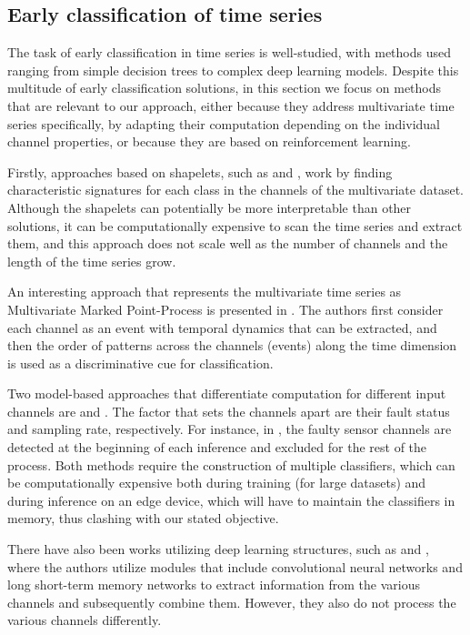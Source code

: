 \documentclass[conference]{IEEEtran}
\begin{document}
\subsection{Early classification of time series}
The task of early classification in time series is well-studied, with methods used ranging from simple decision trees to complex deep learning models\cite{gupta2020ects}. Despite this multitude of early classification solutions, in this section we focus on methods that are relevant to our approach, either because they address multivariate time series specifically, by adapting their computation depending on the individual channel properties, or because they are based on reinforcement learning.

Firstly, approaches based on shapelets, such as \cite{ghalwash2012early} and \cite{he2015early}, work by finding characteristic signatures for each class in the channels of the multivariate dataset. Although the shapelets can potentially be more interpretable than other solutions, it can be computationally expensive to scan the time series and extract them, and this approach does not scale well as the number of channels and the length of the time series grow.

An interesting approach that represents the multivariate time series as Multivariate Marked Point-Process is presented in \cite{li2014early}. The authors first consider each channel as an event with temporal dynamics that can be extracted, and then the order of patterns across the channels (events) along the time dimension is used as a discriminative cue for classification.

Two model-based approaches that differentiate computation for different input channels are \cite{gupta2020fault} and \cite{gupta2020divide}. The factor that sets the channels apart are their fault status and sampling rate, respectively. For instance, in \cite{gupta2020fault}, the faulty sensor channels are detected at the beginning of each inference and excluded for the rest of the process. Both methods require the construction of multiple classifiers, which can be computationally expensive both during training (for large datasets) and during inference on an edge device, which will have to maintain the classifiers in memory, thus clashing with our stated objective.

There have also been works utilizing deep learning structures, such as \cite{huang2018mtsmtd} and \cite{hsu2019multivariate}, where the authors utilize modules that include convolutional neural networks and long short-term memory networks to extract information from the various channels and subsequently combine them. However, they also do not process the various channels differently.
\end{document}
